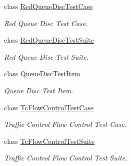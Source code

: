 \begin{DoxyCompactItemize}
class \hyperlink{classRedQueueDiscTestCase}{Red\+Queue\+Disc\+Test\+Case}
\begin{DoxyCompactList}\small\item\em Red Queue Disc Test Case. \end{DoxyCompactList}\item 
class \hyperlink{classRedQueueDiscTestSuite}{Red\+Queue\+Disc\+Test\+Suite}
\begin{DoxyCompactList}\small\item\em Red Queue Disc Test Suite. \end{DoxyCompactList}\item 
class \hyperlink{classQueueDiscTestItem}{Queue\+Disc\+Test\+Item}
\begin{DoxyCompactList}\small\item\em Queue Disc Test Item. \end{DoxyCompactList}\item 
class \hyperlink{classTcFlowControlTestCase}{Tc\+Flow\+Control\+Test\+Case}
\begin{DoxyCompactList}\small\item\em Traffic Control Flow Control Test Case. \end{DoxyCompactList}\item 
class \hyperlink{classTcFlowControlTestSuite}{Tc\+Flow\+Control\+Test\+Suite}
\begin{DoxyCompactList}\small\item\em Traffic Control Flow Control Test Suite. \end{DoxyCompactList}\end{DoxyCompactItemize}

